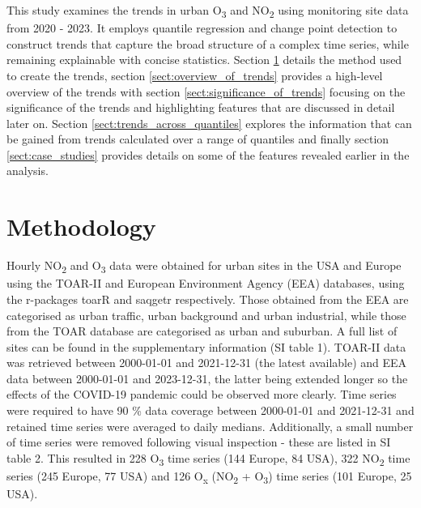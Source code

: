 \documentclass[journal abbreviation, manuscript]{copernicus}
\begin{document}
This study examines the trends in urban O\textsubscript{3} and NO\textsubscript{2} using monitoring site data from 2020 - 2023. It employs quantile regression and change point detection to construct trends that capture the broad structure of a complex time series, while remaining explainable with concise statistics. Section \ref{sect:method} details the method used to create the trends, section \ref{sect:overview_of_trends} provides a high-level overview of the trends with section \ref{sect:significance_of_trends} focusing on the significance of the trends and highlighting features that are discussed in detail later on. Section \ref{sect:trends_across_quantiles} explores the information that can be gained from trends calculated over a range of quantiles and finally section \ref{sect:case_studies} provides details on some of the features revealed earlier in the analysis. 


\section{Methodology} \label{sect:method}
Hourly NO\textsubscript{2} and O\textsubscript{3} data were obtained for urban sites in the USA and Europe using the TOAR-II \citep{toar_db} and European Environment Agency (EEA) \citep{eea_1, eea_2} databases, using the r-packages toarR \citep{drysdale_2024_14537446} and saqgetr \citep{saqgetr} respectively. Those obtained from the EEA are categorised as urban traffic, urban background and urban industrial, while those from the TOAR database are categorised as urban and suburban. A full list of sites can be found in the supplementary information (SI table 1).  TOAR-II data was retrieved between 2000-01-01 and 2021-12-31 (the latest available) and EEA data between 2000-01-01 and 2023-12-31, the latter being extended longer so the effects of the COVID-19 pandemic could be observed more clearly. Time series were required to have 90 \% data coverage between 2000-01-01 and 2021-12-31 and retained time series were averaged to daily medians. Additionally, a small number of time series were removed following visual inspection - these are listed in SI table 2. This resulted in 228 O\textsubscript{3} time series (144 Europe, 84 USA), 322 NO\textsubscript{2} time series (245 Europe, 77 USA) and 126 O\textsubscript{x} (NO\textsubscript{2} + O\textsubscript{3}) time series (101 Europe, 25 USA).
\end{document}
